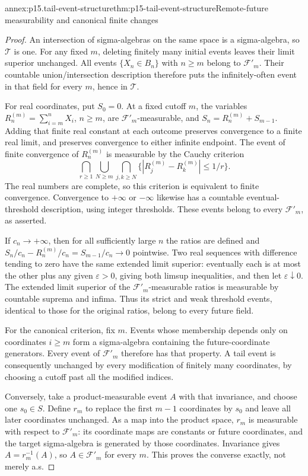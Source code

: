 \begin{annexitem}{annex:p15.tail-event-structure}{thm:p15-tail-event-structure}{Remote-future measurability and canonical finite changes}
\begin{proof}
An intersection of sigma-algebras on the same space is a sigma-algebra,
so \(\mathcal T\) is one. For any fixed \(m\), deleting
finitely many initial events leaves their limit superior unchanged.
All events \(\{X_n\in B_n\}\) with \(n\geq m\) belong
to \(\mathcal F'_m\). Their countable union/intersection
description therefore puts the infinitely-often event in that
field for every \(m\), hence in \(\mathcal T\).

For real coordinates, put \(S_0=0\). At a fixed cutoff \(m\),
the variables \(R_n^{(m)}=\sum_{i=m}^nX_i\), \(n\geq m\),
are \(\mathcal F'_m\)-measurable, and
\(S_n=R_n^{(m)}+S_{m-1}\). Adding that finite real constant
at each outcome preserves convergence to a finite real limit,
and preserves convergence to either infinite endpoint.
The event of finite convergence of \(R_n^{(m)}\) is measurable
by the Cauchy criterion
\[
 \bigcap_{r\geq1}\bigcup_{N\geq m}
       \bigcap_{j,k\geq N}\{|R_j^{(m)}-R_k^{(m)}|\leq1/r\}.
\]
The real numbers are complete, so this criterion is equivalent
to finite convergence. Convergence to \(+\infty\) or
\(-\infty\) likewise has a countable eventual-threshold
description, using integer thresholds. These events belong to
every \(\mathcal F'_m\), as asserted.

If \(c_n\to+\infty\), then for all sufficiently large \(n\)
the ratios are defined and
\(S_n/c_n-R_n^{(m)}/c_n=S_{m-1}/c_n\to0\) pointwise.
Two real sequences with difference tending to zero have the same
extended limit superior: eventually each is at most the other
plus any given \(\varepsilon>0\), giving both limsup
inequalities, and then let \(\varepsilon\downarrow0\).
The extended limit superior of the \(\mathcal F'_m\)-measurable
ratios is measurable by countable suprema and infima. Thus its
strict and weak threshold events, identical to those for the
original ratios, belong to every future field.

For the canonical criterion, fix \(m\). Events whose membership
depends only on coordinates \(i\geq m\) form a sigma-algebra
containing the future-coordinate generators. Every event of
\(\mathcal F'_m\) therefore has that property. A tail event
is consequently unchanged by every modification of finitely many
coordinates, by choosing a cutoff past all the modified indices.

Conversely, take a product-measurable event \(A\) with that
invariance, and choose one \(s_0\in S\). Define \(r_m\)
to replace the first \(m-1\) coordinates by \(s_0\) and
leave all later coordinates unchanged. As a map into the product
space, \(r_m\) is measurable with respect to \(\mathcal F'_m\):
its coordinate maps are constants or future coordinates, and the
target sigma-algebra is generated by those coordinates. Invariance
gives \(A=r_m^{-1}(A)\), so \(A\in\mathcal F'_m\) for
every \(m\). This proves the converse exactly, not merely a.s.


\end{proof}
\end{annexitem}
